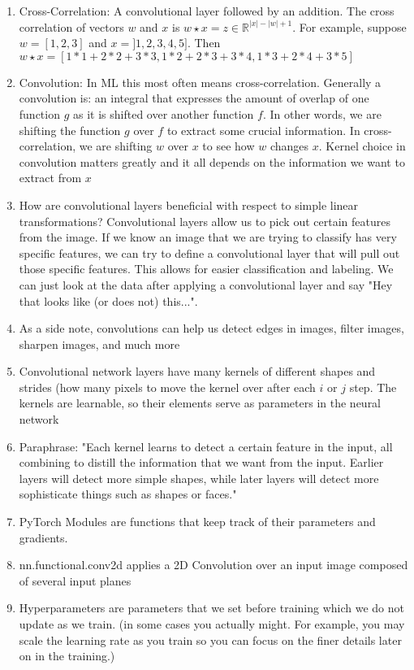 \documentclass[a4paper, 11pt, oneside]{researchjournal} %
\begin{document}
\begin{enumerate}
    \item Cross-Correlation: A convolutional layer followed by an addition. The cross correlation of vectors $w$ and $x$ is $w \star x = z \in \mathbb{R}^{|x|-|w|+1}$. For example, suppose $w = [1,2,3]$ and $x = ]1,2,3,4,5]$. Then $w \star x = [1 * 1 + 2 * 2 + 3 * 3, 1 * 2 + 2 * 3 + 3 * 4, 1 * 3 + 2 * 4 + 3 * 5]$
    \item Convolution: In ML this most often means cross-correlation. Generally a convolution is: an integral that expresses the amount of overlap of one function $g$ as it is shifted over another function $f$. In other words, we are shifting the function $g$ over $f$ to extract some crucial information. In cross-correlation, we are shifting $w$ over $x$ to see how $w$ changes $x$. Kernel choice in convolution matters greatly and it all depends on the information we want to extract from $x$
    \item How are convolutional layers beneficial with respect to simple linear transformations? Convolutional layers allow us to pick out certain features from the image. If we know an image that we are trying to classify has very specific features, we can try to define a convolutional layer that will pull out those specific features. This allows for easier classification and labeling. We can just look at the data after applying a convolutional layer and say "Hey that looks like (or does not) this...". 
    \item As a side note, convolutions can help us detect edges in images, filter images, sharpen images, and much more
    \item Convolutional network layers have many kernels of different shapes and strides (how many pixels to move the kernel over after each $i$ or $j$ step. The kernels are learnable, so their elements serve as parameters in the neural network
    \item Paraphrase: "Each kernel learns to detect a certain feature in the input, all combining to distill the information that we want from the input. Earlier layers will detect more simple shapes, while later layers will detect more sophisticate things such as shapes or faces."
    \item PyTorch Modules are functions that keep track of their parameters and gradients. 
    \item nn.functional.conv2d applies a 2D Convolution over an input image composed of several input planes
    \item Hyperparameters are parameters that we set before training which we do not update as we train. (in some cases you actually might. For example, you may scale the learning rate as you train so you can focus on the finer details later on in the training.)

\end{enumerate}
\end{document}
